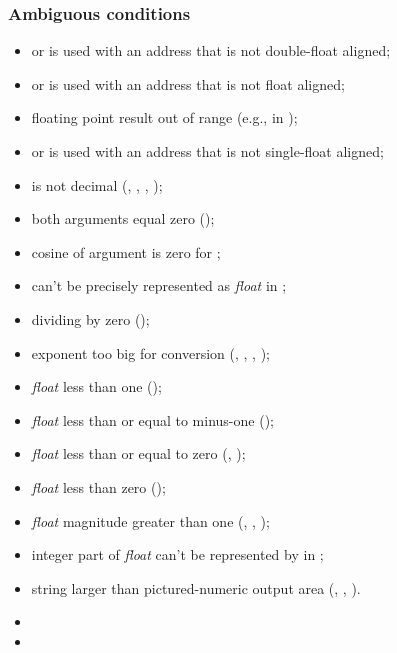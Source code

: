 \subsubsection{Ambiguous conditions} %
\label{float:ambiguous}
\begin{itemize}
\item {} or  is used with an address that is not
	double-float aligned;
\item {} or  is used with an address that is not
	float aligned;
\item floating point result out of range
	(e.g., in );
\item {} or  is used with an address that is not
	single-float aligned;
\item {} is not decimal
	(,
	 ,
	 ,
	 );
\item both arguments equal zero ();
\item cosine of argument is zero for ;
\item {} can't be precisely represented as \emph{float} in
	;
\item dividing by zero ();
\item exponent too big for conversion
	(,
	 ,
	 ,
	 );
\item \emph{float} less than one ();
\item \emph{float} less than or equal to minus-one
	();
\item \emph{float} less than or equal to zero
	(,
	 );
\item \emph{float} less than zero
	();
\item \emph{float} magnitude greater than one
	(,
	 ,
	 );
\item integer part of \emph{float} can't be represented by  in
	;
\item string larger than pictured-numeric output area
	(,
	 ,
	 ).
\item {}
\item {}
\end{itemize}

